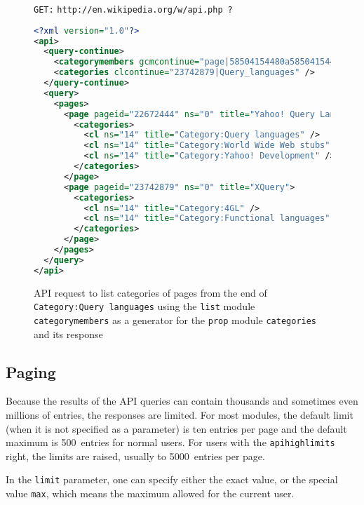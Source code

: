\begin{figure}[p]
\texttt{GET:}
\texttt{http://en.wikipedia.org/w/api.php}~\texttt{?}

\begin{lstlisting}[language=xml]
<?xml version="1.0"?>
<api>
  <query-continue>
    <categorymembers gcmcontinue="page|58504154480a585041544..." />
    <categories clcontinue="23742879|Query_languages" />
  </query-continue>
  <query>
    <pages>
      <page pageid="22672444" ns="0" title="Yahoo! Query Language">
        <categories>
          <cl ns="14" title="Category:Query languages" />
          <cl ns="14" title="Category:World Wide Web stubs" />
          <cl ns="14" title="Category:Yahoo! Development" />
        </categories>
      </page>
      <page pageid="23742879" ns="0" title="XQuery">
        <categories>
          <cl ns="14" title="Category:4GL" />
          <cl ns="14" title="Category:Functional languages" />
        </categories>
      </page>
    </pages>
  </query>
</api>
\end{lstlisting}

\caption[API request to list categories of pages from a category and its response]{
\ac{API} request to list categories of pages
from the end of \texttt{Category:\allowbreak Query languages}
using the \texttt{list} module \texttt{categorymembers} as a generator
for the \texttt{prop} module \texttt{categories}
and its response}
\label{API categories generator example}
\end{figure}

\subsection{Paging}
\label{mw paging}

Because the results of the \ac{API} queries can contain thousands and sometimes even millions of entries,
the responses are limited.
For most modules, the default limit (when it is not specified as a parameter) is ten entries per page
and the default maximum is 500~entries for normal users.
For users with the \texttt{apihighlimits} right, the limits are raised, usually to 5000~entries per page.

In the \texttt{limit} parameter, one can specify either the exact value,
or the special value \texttt{max}, which means the maximum allowed for the current user.

